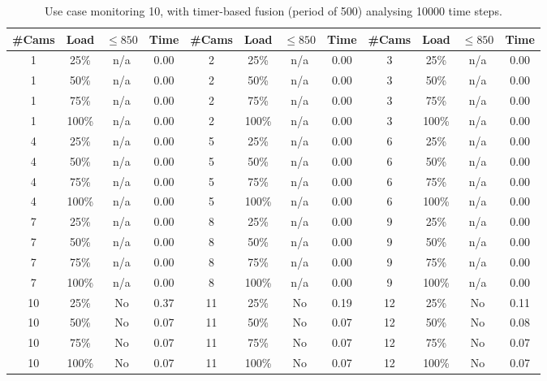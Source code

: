 \documentclass{article}
\begin{document}
\begin{table}
\centering
\begin{tabular}{|c|c|c|c|c|c|c|c|c|c|c|c|}
\hline
\#Cams & Load & $\leq 850$ & Time & \#Cams & Load & $\leq 850$ & Time & \#Cams & Load & $\leq 850$ & Time\\
\hline
1 & 25\% & n/a & 0.00 & 2 & 25\% & n/a & 0.00 & 3 & 25\% & n/a & 0.00\\
1 & 50\% & n/a & 0.00 & 2 & 50\% & n/a & 0.00 & 3 & 50\% & n/a & 0.00\\
1 & 75\% & n/a & 0.00 & 2 & 75\% & n/a & 0.00 & 3 & 75\% & n/a & 0.00\\
1 & 100\% & n/a & 0.00 & 2 & 100\% & n/a & 0.00 & 3 & 100\% & n/a & 0.00\\
\hline
4 & 25\% & n/a & 0.00 & 5 & 25\% & n/a & 0.00 & 6 & 25\% & n/a & 0.00\\
4 & 50\% & n/a & 0.00 & 5 & 50\% & n/a & 0.00 & 6 & 50\% & n/a & 0.00\\
4 & 75\% & n/a & 0.00 & 5 & 75\% & n/a & 0.00 & 6 & 75\% & n/a & 0.00\\
4 & 100\% & n/a & 0.00 & 5 & 100\% & n/a & 0.00 & 6 & 100\% & n/a & 0.00\\
\hline
7 & 25\% & n/a & 0.00 & 8 & 25\% & n/a & 0.00 & 9 & 25\% & n/a & 0.00\\
7 & 50\% & n/a & 0.00 & 8 & 50\% & n/a & 0.00 & 9 & 50\% & n/a & 0.00\\
7 & 75\% & n/a & 0.00 & 8 & 75\% & n/a & 0.00 & 9 & 75\% & n/a & 0.00\\
7 & 100\% & n/a & 0.00 & 8 & 100\% & n/a & 0.00 & 9 & 100\% & n/a & 0.00\\
\hline
10 & 25\% & No & 0.37 & 11 & 25\% & No & 0.19 & 12 & 25\% & No & 0.11\\
10 & 50\% & No & 0.07 & 11 & 50\% & No & 0.07 & 12 & 50\% & No & 0.08\\
10 & 75\% & No & 0.07 & 11 & 75\% & No & 0.07 & 12 & 75\% & No & 0.07\\
10 & 100\% & No & 0.07 & 11 & 100\% & No & 0.07 & 12 & 100\% & No & 0.07\\
\hline
\end{tabular}
\caption{Use case monitoring 10, with timer-based fusion (period of 500) analysing 10000 time steps.}
\end{table}
\end{document}
